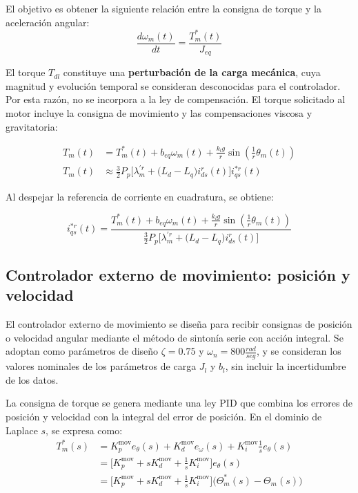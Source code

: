 \documentclass[blue,fullpaper]{ludusofficial}  %
\begin{document}
El objetivo es obtener la siguiente relación entre la consigna de torque y la aceleración angular:
\[
\frac{d\omega_{m}(t)}{dt} = \frac{T_{m}^{*}(t)}{J_{eq}} 
\]

El torque $T_{dl}$ constituye una \textbf{perturbación de la carga mecánica}, cuya magnitud y evolución temporal se consideran desconocidas para el controlador. Por esta razón, no se incorpora a la ley de compensación. El torque solicitado al motor incluye la consigna de movimiento y las compensaciones viscosa y gravitatoria:

\begin{align*}
T_{m}(t) & = T_{m}^{*}(t) +b_{eq}\omega_{m}(t) + \frac{k_{l}g}{r} \sin \left( \frac{1}{r} \theta_{m}(t)  \right) \\
T_{m}(t) & \approx \frac{3}{2}P_{p} \Big[ \lambda_{m}^{'r} + \Big( L_{d}-L_{q} \Big)i_{ds}^{r}(t) \Big] i_{qs}^{*r}(t)
\end{align*}

Al despejar la referencia de corriente en cuadratura, se obtiene:

$$
i_{qs}^{*r}(t) = \frac{T_{m}^{*}(t) +b_{eq}\omega_{m}(t) + \frac{k_{l}g}{r} \sin \left( \frac{1}{r} \theta_{m}(t)  \right)}{\frac{3}{2}P_{p} \Big[ \lambda_{m}^{'r} + \Big( L_{d}-L_{q} \Big)i_{ds}^{r}(t) \Big]}
$$




\subsection{Controlador externo de movimiento: posición y velocidad}

El controlador externo de movimiento se diseña para recibir consignas de posición o velocidad angular mediante el método de sintonía serie con acción integral. Se adoptan como parámetros de diseño $\zeta = 0.75$ y $\omega_{n}=800 \frac{rad}{seg}$, y se consideran los valores nominales de los parámetros de carga $J_{l}$ y $b_{l}$, sin incluir la incertidumbre de los datos.

La consigna de torque se genera mediante una ley PID que combina los errores de posición y velocidad con la integral del error de posición. En el dominio de Laplace $s$, se expresa como:
\begin{align*}
T_{m}^{*}(s) & = K_{p}^{\text{mov}}e_{\theta}(s) + K_{d}^{\text{mov}} e_{\omega}(s) + K_{i}^{\text{mov}} \frac{1}{s} e_{\theta}(s) \\
 & = \Big[  K_{p}^{\text{mov}} + sK_{d}^{\text{mov}} + \frac{1}{s}K_{i}^{\text{mov}} \Big] e_{\theta}(s) \\
 & = \Big[  K_{p}^{\text{mov}} + sK_{d}^{\text{mov}} + \frac{1}{s}K_{i}^{\text{mov}} \Big] \Big( \Theta^{*}_{m}(s) - \Theta_{m}(s) \Big) %
\end{align*}
\end{document}
